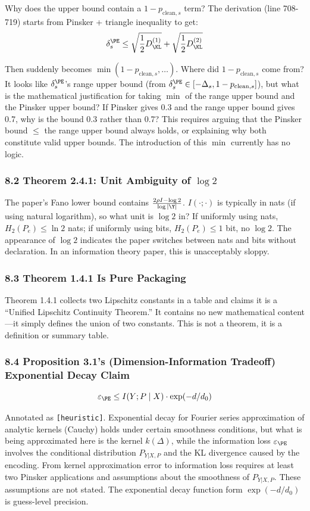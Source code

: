 \documentclass[
  12pt,
]{article}
\begin{document}
Why does the upper bound contain a \(1-p_{\text{clean},s}\) term? The derivation (line 708-719) starts from Pinsker + triangle inequality to get:
\[\delta_s^{\PE} \leq \sqrt{\frac{1}{2}D_{\KL}^{(1)}} + \sqrt{\frac{1}{2}D_{\KL}^{(2)}}\]

Then suddenly becomes \(\min(1-p_{\text{clean},s}, \ldots)\). Where did \(1-p_{\text{clean},s}\) come from? It looks like \(\delta_s^{\PE}\)'s range upper bound (from \(\delta_s^{\PE} \in [-\Delta_s, 1-p_{\text{clean},s}]\)), but what is the mathematical justification for taking \(\min\) of the range upper bound and the Pinsker upper bound? If Pinsker gives 0.3 and the range upper bound gives 0.7, why is the bound 0.3 rather than 0.7? This requires arguing that the Pinsker bound \(\leq\) the range upper bound always holds, or explaining why both constitute valid upper bounds. The introduction of this \(\min\) currently has no logic.

\subsubsection{8.2 Theorem 2.4.1: Unit Ambiguity of \(\log 2\)}\label{log-2-ambiguity}

The paper's Fano lower bound contains \(\frac{2\rho I - \log 2}{\log|\Y|}\). \(I(\cdot;\cdot)\) is typically in nats (if using natural logarithm), so what unit is \(\log 2\) in? If uniformly using nats, \(H_2(P_e) \leq \ln 2\) nats; if uniformly using bits, \(H_2(P_e) \leq 1\) bit, no \(\log 2\). The appearance of \(\log 2\) indicates the paper switches between nats and bits without declaration. In an information theory paper, this is unacceptably sloppy.

\subsubsection{8.3 Theorem 1.4.1 Is Pure Packaging}\label{theorem-141-packaging}

Theorem 1.4.1 collects two Lipschitz constants in a table and claims it is a ``Unified Lipschitz Continuity Theorem.'' It contains no new mathematical content---it simply defines the union of two constants. This is not a theorem, it is a definition or summary table.

\subsubsection{8.4 Proposition 3.1's (Dimension-Information Tradeoff) Exponential Decay Claim}\label{exponential-decay-claim}

\[\varepsilon_{\PE} \leq I(Y; P \mid X) \cdot \exp(-d/d_0)\]

Annotated as \texttt{[heuristic]}. Exponential decay for Fourier series approximation of analytic kernels (Cauchy) holds under certain smoothness conditions, but what is being approximated here is the kernel \(k(\Delta)\), while the information loss \(\varepsilon_{\PE}\) involves the conditional distribution \(P_{Y|X,P}\) and the KL divergence caused by the encoding. From kernel approximation error to information loss requires at least two Pinsker applications and assumptions about the smoothness of \(P_{Y|X,P}\). These assumptions are not stated. The exponential decay function form \(\exp(-d/d_0)\) is guess-level precision.
\end{document}
